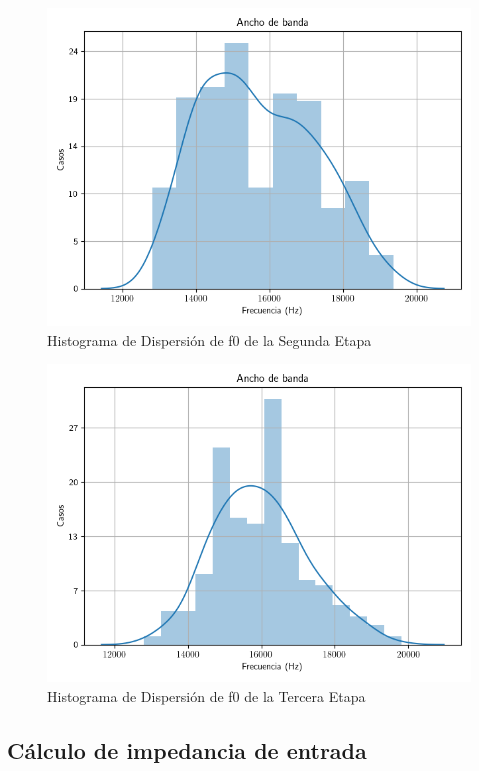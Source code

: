 \begin{figure}[H]
    \centering
    \includegraphics[scale = 0.4]{../Ejercicio2-DisenoDeCeldas/4CeldaUniversal/Informe/dis2.png}
    \caption{Histograma de Dispersión de f0 de la Segunda Etapa}
    \label{ej4dis2}
\end{figure}

\begin{figure}[H]
    \centering
    \includegraphics[scale = 0.4]{../Ejercicio2-DisenoDeCeldas/4CeldaUniversal/Informe/dis3.png}
    \caption{Histograma de Dispersión de f0 de la Tercera Etapa}
    \label{ej4dis3}
\end{figure}

\subsection{Cálculo de impedancia de entrada}

